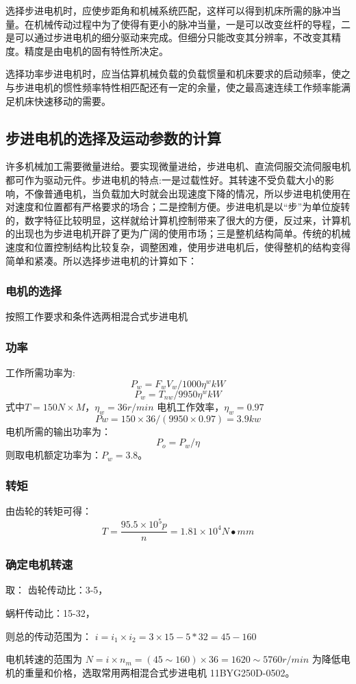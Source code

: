 \documentclass[a4paper,12pt]{article}
\begin{document}
选择步进电机时，应使步距角和机械系统匹配，这样可以得到机床所需的脉冲当量。在机械传动过程中为了使得有更小的脉冲当量，一是可以改变丝杆的导程，二是可以通过步进电机的细分驱动来完成。但细分只能改变其分辨率，不改变其精度。精度是由电机的固有特性所决定。 

选择功率步进电机时，应当估算机械负载的负载惯量和机床要求的启动频率，使之与步进电机的惯性频率特性相匹配还有一定的余量，使之最高速连续工作频率能满足机床快速移动的需要。
\subsection{步进电机的选择及运动参数的计算}
许多机械加工需要微量进给。要实现微量进给，步进电机、直流伺服交流伺服电机都可作为驱动元件。步进电机的特点:一是过载性好。其转速不受负载大小的影响，不像普通电机，当负载加大时就会出现速度下降的情况，所以步进电机使用在对速度和位置都有严格要求的场合；二是控制方便。步进电机是以“步”为单位旋转的，数字特征比较明显，这样就给计算机控制带来了很大的方便，反过来，计算机的出现也为步进电机开辟了更为广阔的使用市场；三是整机结构简单。传统的机械速度和位置控制结构比较复杂，调整困难，使用步进电机后，使得整机的结构变得简单和紧凑。所以选择步进电机的计算如下：

\subsubsection{电机的选择}
按照工作要求和条件选两相混合式步进电机
\subsubsection{功率}
工作所需功率为: $$ P_w = F_w V_w/1000\eta^wkW$$
$$P_w=T_{nw}/9950\eta^wkW$$
式中$T=150N\times M$，$\eta_w=36 r/min$ 电机工作效率，$\eta_w=0.97$ 
 $$Pw=150\times 36/(9950\times 0.97 )=3.9kw$$
电机所需的输出功率为：
$$P_o=P_w/\eta$$
则取电机额定功率为：$P_w=3.8$。
\subsubsection{转矩}
由齿轮的转矩可得：$$ T=\dfrac{95.5\times 10^5 p}{n} =1.81 \times 10^4 N\bullet mm$$
\subsubsection{确定电机转速}
取：
齿轮传动比：3-5，

蜗杆传动比：15-32，

则总的传动范围为：
$i=i_1\times i_2 =3\times 15-5*32 =45-160$

电机转速的范围为
 $N=i\times n_m = (45\sim 160)\times 36=1620\sim 5760 r/min$
为降低电机的重量和价格，选取常用两相混合式步进电机 11BYG250D-0502。
\end{document}
